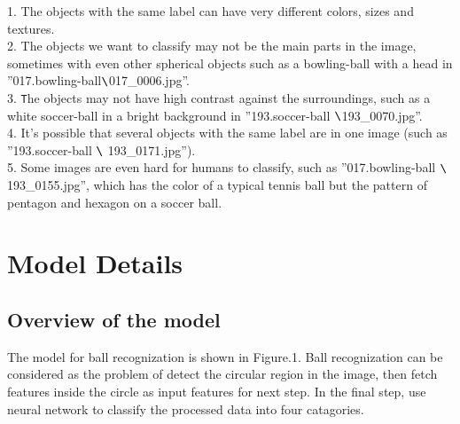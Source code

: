 \documentclass{article}
\begin{document}
1. The objects with the same label can have very different colors, sizes and textures.\\
2. The objects we want to classify may not be the main parts in the image, sometimes with even other spherical objects
such as a bowling-ball with a head in ''017.bowling-ball$ \verb|\|$017\_0006.jpg''.\\3. \texttt{T}he objects may not have high contrast against the surroundings, such as a white soccer-ball in a bright background in ''193.soccer-ball $ \verb|\|$193\_0070.jpg''.\\
4. It's possible that several objects with the same label are in one image (such as ''193.soccer-ball $ \verb|\|$ 193\_0171.jpg'').\\
5. Some images are even hard for humans to classify, such as ''017.bowling-ball $ \verb|\|$ 193\_0155.jpg'', which has the color of a typical tennis ball but the pattern of pentagon and hexagon on a soccer ball.\\


\section{Model Details} 


\subsection{Overview of the model}
The model for ball recognization is shown in Figure.1. Ball recognization can be considered as the problem of detect the circular region in the image, then fetch features inside the circle as input features for next step. In the final step, use neural network to classify the processed data into four catagories.\\
\end{document}
